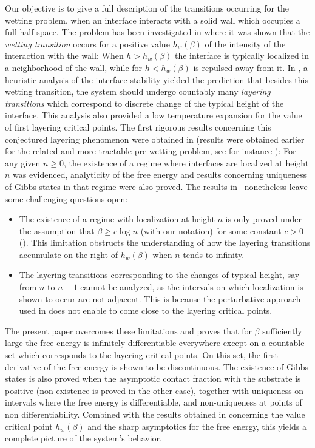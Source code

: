 \documentclass[10pt]{amsart}
\numberwithin{equation}{section}
\theoremstyle{plain}
\theoremstyle{definition}
\newcommand{\gb}{\beta}
\begin{document}
Our objective is to give a full description of the transitions occurring for the wetting problem,
when an interface interacts with a solid wall which occupies a full half-space.
The problem has been investigated in \cite{cf:chal} where it was shown that the \textit{wetting transition}
occurs for a positive value $h_w(\gb)$
of the intensity of the interaction with the wall: When $h>h_w(\gb)$ the interface is typically localized in a neighborhood of the wall, while for $h<h_w(\gb)$
is repulsed away from it.
In \cite{cf:AY}, a heuristic analysis of the interface stability yielded the prediction that besides this wetting transition, the system should undergo
countably many \textit{layering transitions} which correspond to discrete change of the typical height of the interface.
This analysis also provided a low temperature expansion for the value of first layering critical points.
The first rigorous results concerning this conjectured layering phenomenon were obtained in \cite{cf:ADM}
(results were obtained earlier for the related and more tractable pre-wetting problem, see for instance \cite{cf:CM, cf:DM}): For any given $n\ge 0$, the existence of a
regime where interfaces are localized at height $n$ was evidenced, analyticity of the free energy and results concerning uniqueness of Gibbs states in that regime
were also proved.
The results in~\cite{cf:ADM} nonetheless leave some challenging questions open:
\begin{itemize}
\item [(A)] The existence of a regime with localization at height $n$ is only proved under the assumption that $\gb\ge c \log n$ (with our notation) for some constant $c>0$
(\cf \cite[Rem.\,(4) p.\,528]{cf:ADM}). This limitation obstructs the understanding of how the layering transitions accumulate on the right of $h_w(\gb)$ when $n$ tends to infinity.
\item [(B)] The layering transitions corresponding to the changes of typical height, say from $n$ to $n-1$ cannot be analyzed,
as the intervals on which localization is
shown to occur are not adjacent. This is because the perturbative approach used in \cite{cf:ADM} does not enable to come close to the layering critical points.
\end{itemize}
The present paper overcomes these limitations and proves that for $\gb$ sufficiently large
the free energy is infinitely differentiable everywhere except on a countable set which
corresponds to the layering critical points. On this set, the first derivative of the free energy is shown to be discontinuous.
The existence of Gibbs states is also proved when the asymptotic contact fraction with the substrate is positive (non-existence is proved in the other case), together with uniqueness on intervals
where the free energy is differentiable, and non-uniqueness at points of non differentiability.
Combined with the results obtained in \cite{cf:part1} concerning the value critical point $h_w(\gb)$
and the sharp asymptotics for the free energy, this yields a complete picture of the system's behavior.
\end{document}
